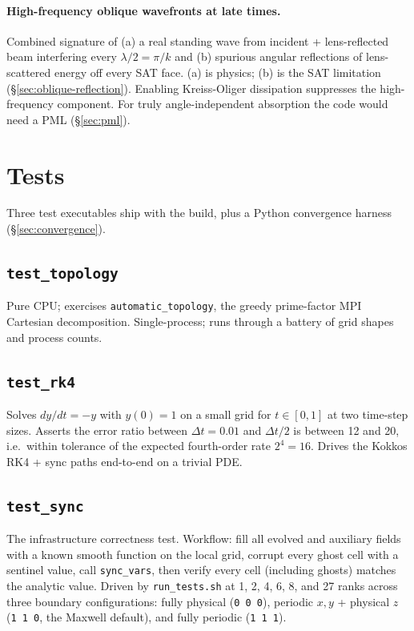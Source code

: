 \documentclass[11pt]{article}
\begin{document}
\paragraph{High-frequency oblique wavefronts at late times.}
Combined signature of (a) a real standing wave from incident +
lens-reflected beam interfering every $\lambda/2 = \pi/k$ and (b)
spurious angular reflections of lens-scattered energy off every
SAT face.  (a) is physics; (b) is the SAT limitation
(\S\ref{sec:oblique-reflection}).  Enabling Kreiss-Oliger
dissipation suppresses the high-frequency component.  For truly
angle-independent absorption the code would need a PML
(\S\ref{sec:pml}).

\section{Tests}
\label{sec:tests}

Three test executables ship with the build, plus a Python
convergence harness (\S\ref{sec:convergence}).

\subsection{\texttt{test\_topology}}

Pure CPU; exercises \texttt{automatic\_topology}, the greedy
prime-factor MPI Cartesian decomposition.  Single-process; runs
through a battery of grid shapes and process counts.

\subsection{\texttt{test\_rk4}}

Solves $dy/dt = -y$ with $y(0) = 1$ on a small grid for
$t \in [0, 1]$ at two time-step sizes.  Asserts the error ratio
between $\Delta t = 0.01$ and $\Delta t/2$ is between 12 and 20,
i.e.\ within tolerance of the expected fourth-order rate
$2^4 = 16$.  Drives the Kokkos RK4 + sync paths end-to-end on a
trivial PDE.

\subsection{\texttt{test\_sync}}

The infrastructure correctness test.  Workflow: fill all evolved
and auxiliary fields with a known smooth function on the local
grid, corrupt every ghost cell with a sentinel value, call
\texttt{sync\_vars}, then verify every cell (including ghosts)
matches the analytic value.  Driven by \texttt{run\_tests.sh} at
1, 2, 4, 6, 8, and 27 ranks across three boundary configurations:
fully physical (\texttt{0 0 0}), periodic $x, y$ + physical $z$
(\texttt{1 1 0}, the Maxwell default), and fully periodic
(\texttt{1 1 1}).
\end{document}
